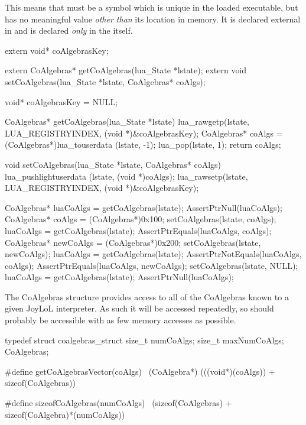 This means that  must be a symbol which is unique in 
the loaded executable, but has no meaningful value \emph{other than} its 
location in memory. It is declared external in  and is 
declared \emph{only} in the  itself. 

\startCHeader
extern void* coAlgebrasKey;

extern CoAlgebras* getCoAlgebras(lua_State *lstate);
extern void setCoAlgebras(lua_State *lstate, CoAlgebras* coAlgs);
\stopCHeader

\startCCode
void* coAlgebrasKey = NULL;

CoAlgebras* getCoAlgebras(lua_State *lstate) {
  lua_rawgetp(lstate, LUA_REGISTRYINDEX, (void *)&coAlgebrasKey);
  CoAlgebras* coAlgs = (CoAlgebras*)lua_touserdata (lstate, -1);
  lua_pop(lstate, 1);
  return coAlgs;
}

void setCoAlgebras(lua_State *lstate, CoAlgebras* coAlgs) {
  lua_pushlightuserdata (lstate, (void *)coAlgs);
  lua_rawsetp(lstate, LUA_REGISTRYINDEX, (void *)&coAlgebrasKey);
}
\stopCCode


\startCTest
  CoAlgebras* luaCoAlgs = getCoAlgebras(lstate);
  AssertPtrNull(luaCoAlgs);
  CoAlgebras* coAlgs = (CoAlgebras*)0x100;
  setCoAlgebras(lstate, coAlgs);
  luaCoAlgs = getCoAlgebras(lstate);
  AssertPtrEquals(luaCoAlgs, coAlgs);
  CoAlgebras* newCoAlgs = (CoAlgebras*)0x200;
  setCoAlgebras(lstate, newCoAlgs);
  luaCoAlgs = getCoAlgebras(lstate);
  AssertPtrNotEquals(luaCoAlgs, coAlgs);
  AssertPtrEquals(luaCoAlgs, newCoAlgs);
  setCoAlgebras(lstate, NULL);
  luaCoAlgs = getCoAlgebras(lstate);
  AssertPtrNull(luaCoAlgs);
\stopCTest
\stopTestCase
\stopTestSuite

\startTestSuite[registerCoAlgebra]

The CoAlgebras structure provides access to all of the CoAlgebras known to 
a given JoyLoL interpreter. As such it will be accessed repeatedly, so 
should probably be accessible with as few memory accesses as possible. 

\startCHeader
typedef struct coalgebras_struct {
  size_t numCoAlgs;
  size_t maxNumCoAlgs;
} CoAlgebras;

#define getCoAlgebrasVector(coAlgs) \
  (CoAlgebra*) (((void*)(coAlgs)) + sizeof(CoAlgebras))

#define sizeofCoAlgebras(numCoAlgs) \
  (sizeof(CoAlgebras) + sizeof(CoAlgebra)*(numCoAlgs))
  
